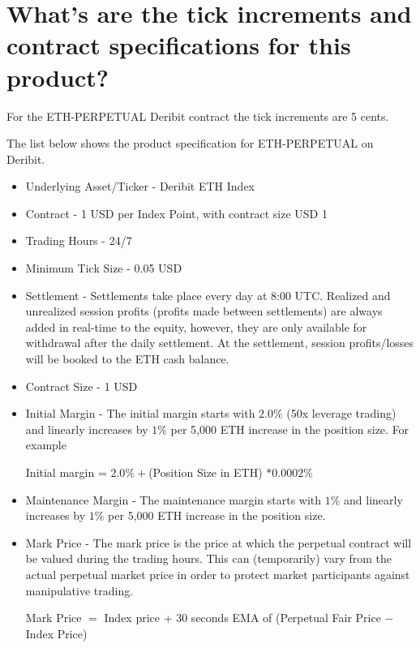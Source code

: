 \section{What's are the tick increments and contract specifications for this product?}
For the ETH-PERPETUAL Deribit contract the tick increments are 5 cents.

The list below shows the product specification for ETH-PERPETUAL on Deribit.

\begin{itemize}
\item Underlying Asset/Ticker - Deribit ETH Index 
 
\item Contract - 1 USD per Index Point, with contract size USD 1 
 
\item Trading Hours - 24/7 
 
\item Minimum Tick Size - 0.05 USD

\item Settlement - Settlements take place every day at 8:00 UTC. Realized and unrealized session profits (profits made between settlements) are always added in real-time to the equity, however, they are only available for withdrawal after the daily settlement. At the settlement, session profits/losses will be booked to the ETH cash balance.

\item Contract Size - 1 USD
 
\item Initial Margin - The initial margin starts with $2.0 \%$ (50x leverage trading) and linearly increases by $1 \%$ per 5,000 ETH increase in the position size.
For example
 

Initial margin = $2.0 \%  + $(Position Size in ETH) $ * 0.0002\%$ 
 
\item Maintenance Margin - 	
The maintenance margin starts with $1 \%$ and linearly increases by $1 \%$ per 5,000 ETH increase in the position size.
 
\item Mark Price - The mark price is the price at which the perpetual contract will be valued during the trading hours. This can (temporarily) vary from the actual perpetual market price in order to protect market participants against manipulative trading.

Mark Price $=$ Index price + 30 seconds EMA of (Perpetual Fair Price $-$ Index Price)



\end{itemize}
